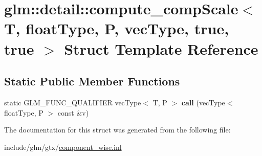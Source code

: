 \hypertarget{structglm_1_1detail_1_1compute__compScale_3_01T_00_01floatType_00_01P_00_01vecType_00_01true_00_01true_01_4}{}\section{glm\+:\+:detail\+:\+:compute\+\_\+comp\+Scale$<$ T, float\+Type, P, vec\+Type, true, true $>$ Struct Template Reference}
\label{structglm_1_1detail_1_1compute__compScale_3_01T_00_01floatType_00_01P_00_01vecType_00_01true_00_01true_01_4}
\subsection*{Static Public Member Functions}
\begin{DoxyCompactItemize}
\item 
\mbox{\label{structglm_1_1detail_1_1compute__compScale_3_01T_00_01floatType_00_01P_00_01vecType_00_01true_00_01true_01_4_abbca70bf822f53099b06c2c14c200110}} 
static G\+L\+M\+\_\+\+F\+U\+N\+C\+\_\+\+Q\+U\+A\+L\+I\+F\+I\+ER vec\+Type$<$ T, P $>$ {\bfseries call} (vec\+Type$<$ float\+Type, P $>$ const \&v)
\end{DoxyCompactItemize}


The documentation for this struct was generated from the following file\+:\begin{DoxyCompactItemize}
\item 
include/glm/gtx/\hyperlink{component__wise_8inl}{component\+\_\+wise.\+inl}\end{DoxyCompactItemize}
